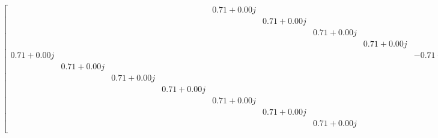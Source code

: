 \begin{gather*}
\begin{bmatrix}
            &            &            &            & 0.71+0.00j &            &            &            &            &            &            &            & 0.00+0.71j &            &            &            \\
            &            &            &            &            & 0.71+0.00j &            &            &            &            &            &            &            &-0.27+0.65j &            &            \\
            &            &            &            &            &            & 0.71+0.00j &            &            &            &            &            &            &            &-0.50+0.50j &            \\
            &            &            &            &            &            &            & 0.71+0.00j &            &            &            &            &            &            &            &-0.65+0.27j \\
 0.71+0.00j &            &            &            &            &            &            &            &-0.71+0.00j &            &            &            &            &            &            &            \\
            & 0.71+0.00j &            &            &            &            &            &            &            &-0.65-0.27j &            &            &            &            &            &            \\
            &            & 0.71+0.00j &            &            &            &            &            &            &            &-0.50-0.50j &            &            &            &            &            \\
            &            &            & 0.71+0.00j &            &            &            &            &            &            &            &-0.27-0.65j &            &            &            &            \\
            &            &            &            & 0.71+0.00j &            &            &            &            &            &            &            &-0.00-0.71j &            &            &            \\
            &            &            &            &            & 0.71+0.00j &            &            &            &            &            &            &            & 0.27-0.65j &            &            \\
            &            &            &            &            &            & 0.71+0.00j &            &            &            &            &            &            &            & 0.50-0.50j &            \\

\end{bmatrix}
\end{gather*}
